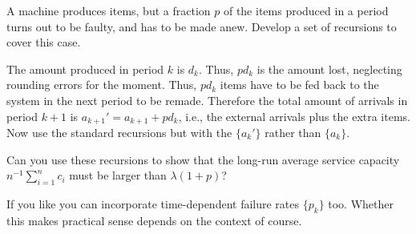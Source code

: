\begin{exercise}
  A machine produces items, but a fraction $p$ of the items produced in a period turns out to be faulty, and has to be made anew.
  Develop a set of recursions to cover this case.
  \begin{solution}
    The amount produced in period $k$ is $d_k$. Thus, $p d_k$ is the
    amount lost, neglecting rounding errors for the moment. Thus,
    $p d_k$ items have to be fed back to the system in the next period
    to be remade. Therefore the total amount of arrivals in period
    $k+1$ is $a_{k+1}'=a_{k+1}+pd_k$, i.e., the external arrivals plus
    the extra items. Now use the standard recursions but with the
    $\{a_{k}'\}$ rather than $\{a_k\}$.

    Can you use these recursions to show that the long-run average
    service capacity $n^{-1}\sum_{i=1}^n c_i$ must be larger than
    $\lambda(1+p)$?

    If you like you can incorporate time-dependent failure rates
    $\{p_k\}$ too. Whether this makes practical sense depends on the
    context of course.
      \end{solution}
\end{exercise}

